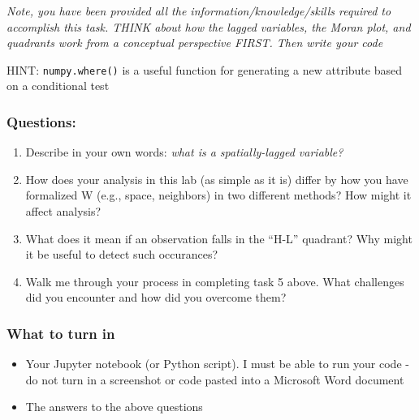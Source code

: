 \documentclass[]{article}
\begin{document}
\emph{Note, you have been provided all the information/knowledge/skills
required to accomplish this task. THINK about how the lagged variables,
the Moran plot, and quadrants work from a conceptual perspective FIRST.
Then write your code}

HINT: \texttt{numpy.where()} is a useful function for generating a new
attribute based on a conditional test

\hypertarget{questions}{%
\subsubsection{Questions:}\label{questions}}

\begin{enumerate}
\def\labelenumi{\arabic{enumi}.}
\item
  Describe in your own words: \emph{what is a spatially-lagged
  variable?}
\item
  How does your analysis in this lab (as simple as it is) differ by how
  you have formalized W (e.g., space, neighbors) in two different
  methods? How might it affect analysis?
\item
  What does it mean if an observation falls in the ``H-L'' quadrant? Why
  might it be useful to detect such occurances?
\item
  Walk me through your process in completing task 5 above. What
  challenges did you encounter and how did you overcome them?
\end{enumerate}

\hypertarget{what-to-turn-in}{%
\subsubsection{What to turn in}\label{what-to-turn-in}}

\begin{itemize}
\item
  Your Jupyter notebook (or Python script). I must be able to run your
  code - do not turn in a screenshot or code pasted into a Microsoft
  Word document
\item
  The answers to the above questions
\end{itemize}
\end{document}
